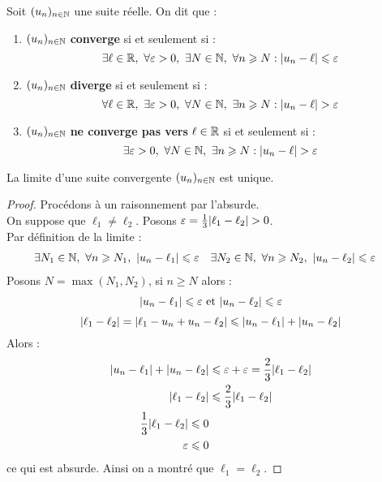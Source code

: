 \begin{definition}
    Soit $(u_n)_{n \in \mathbb{N}}$ une suite réelle. On dit que :
    \begin{enumerate}
        \item $(u_n)_{n \in \mathbb{N}}$ \textbf{converge} si et seulement si : 
        \[ \exists \ell \in \mathbb{R},\ \forall \varepsilon > 0,\ \exists N \in \mathbb{N},\ \forall n \geqslant N : \abs{u_n - \ell} \leqslant \varepsilon \]
        \item $(u_n)_{n \in \mathbb{N}}$ \textbf{diverge} si et seulement si : 
        \[ \forall \ell \in \mathbb{R},\ \exists \varepsilon > 0,\ \forall N \in \mathbb{N},\ \exists n \geqslant N : \abs{u_n - \ell} > \varepsilon \]
        \item $(u_n)_{n \in \mathbb{N}}$ \textbf{ne converge pas vers} $\ell \in \mathbb{R}$ si et seulement si : 
        \[ \exists \varepsilon > 0,\ \forall N \in \mathbb{N},\ \exists n \geqslant N : \abs{u_n - \ell} > \varepsilon \]
    \end{enumerate}
\end{definition}

\begin{theorem}
    La limite d'une suite convergente $(u_n)_{n \in \mathbb{N}}$ est unique.
\end{theorem}

\begin{proof}
    Procédons à un raisonnement par l'absurde.
    \\
    On suppose que $\ell_1 \neq \ell_2$. Posons $\varepsilon = \frac{1}{3} \abs{\ell_1 - \ell_2} > 0$.
    \\
    Par définition de la limite :
    \begin{align*}
        &\exists N_1 \in \mathbb{N},\ \forall n \geqslant N_1,\ \abs{u_n - \ell_1} \leqslant \varepsilon 
        &
        &\exists N_2 \in \mathbb{N},\ \forall n \geqslant N_2,\ \abs{u_n - \ell_2} \leqslant \varepsilon
    \end{align*}
    Posons $N = \max(N_1, N_2)$, si $n \geq N$ alors :
    \begin{align*}
        \abs{u_n - \ell_1} \leqslant \varepsilon \text{ et } \abs{u_n - \ell_2} \leqslant \varepsilon
    \end{align*}
    \[ \abs{\ell_1 - \ell_2} = \abs{\ell_1 - u_n + u_n - \ell_2} \leqslant \abs{u_n - \ell_1} + \abs{u_n - \ell_2} \]
    Alors : 
    \begin{align*}
        \abs{u_n - \ell_1} + \abs{u_n - \ell_2} &\leqslant \varepsilon + \varepsilon = \frac{2}{3} \abs{\ell_1 - \ell_2} \\
        \abs{\ell_1 - \ell_2} &\leqslant \frac{2}{3} \abs{\ell_1 - \ell_2} \\
        \frac{1}{3} \abs{\ell_1 - \ell_2} \leqslant 0 \\
        \varepsilon \leqslant 0
    \end{align*}
    ce qui est absurde. Ainsi on a montré que $\ell_1 = \ell_2$.
\end{proof}

